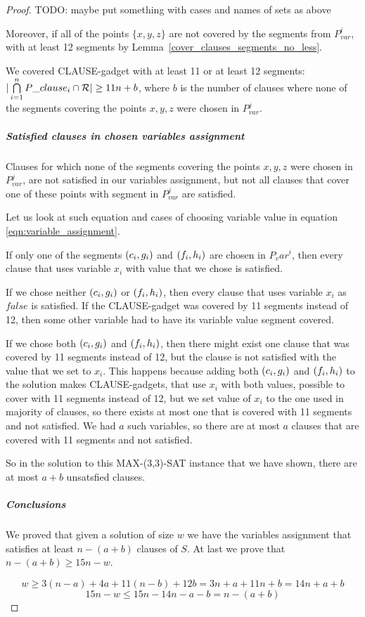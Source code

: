 \begin{proof}
TODO: maybe put something with cases and names of sets as above

Moreover, if all of the points $\{x, y, z\}$
are not covered by the segments from $P_{var}^i$,
with at least 12 segments
by Lemma~\ref{cover_clauses_segments_no_less}.


We covered CLAUSE-gadget with at least 11 or at least 12 segments:
$|\bigcap\limits_{i=1}^n P\_clause_i \cap \mathcal{R}| \ge 11n + b$,
where $b$ is the number of clauses
where none of the segments covering the points $x, y, z$ were chosen
in $P_{var}^j$.

\subparagraph{Satisfied clauses in chosen variables assignment}

Clauses for which none of the segments covering
the points $x, y, z$ were chosen in $P_{var}^j$,
are not satisfied in our variables assignment, but not all clauses
that cover one of these points with segment in $P_{var}^j$ are satisfied.

Let us look at such equation and cases of choosing variable value in
equation \eqref{eqn:variable_assignment}.

If only one of the segments $(c_i, g_i)$ and $(f_i, h_i)$
are chosen in $P_var^{i}$, then every clause that uses variable $x_i$ 
with value that we chose is satisfied.

If we chose neither $(c_i, g_i)$ or $(f_i, h_i)$,
then every clause that uses variable $x_i$ as $false$
is satisfied. If the CLAUSE-gadget was covered by 11 segments
instead of 12, then some other variable had to have its
variable value segment covered.

If we chose both $(c_i, g_i)$ and $(f_i, h_i)$,
then there might exist one clause that was covered by 11 segments
instead of 12, but the clause is not satisfied with the value
that we set to $x_i$. This happens because adding both
$(c_i, g_i)$ and $(f_i, h_i)$ to the solution makes 
CLAUSE-gadgets, that use $x_i$ with both values, possible
to cover with 11 segments instead of 12, but we set value
of $x_i$ to the one used in majority of clauses, so there exists
at most one that is covered with 11 segments and not satisfied.
We had $a$ such variables, so there are at most $a$ clauses that
are covered with 11 segments and not satisfied.

So in the solution to this MAX-(3,3)-SAT instance that we have shown,
there are at most $a+b$ unsatsfied clauses.

\subparagraph{Conclusions}

We proved that given a solution of size $w$ we have
the variables assignment that satisfies at least $n-(a+b)$ clauses of $S$.
At last we prove that $n-(a+b) \ge 15n-w$.

$$w \ge 3(n-a) + 4a + 11(n-b) + 12b = 3n + a + 11n + b = 14n + a + b$$
$$15n - w  \le 15n - 14n - a - b = n - (a+b)$$

\end{proof}


